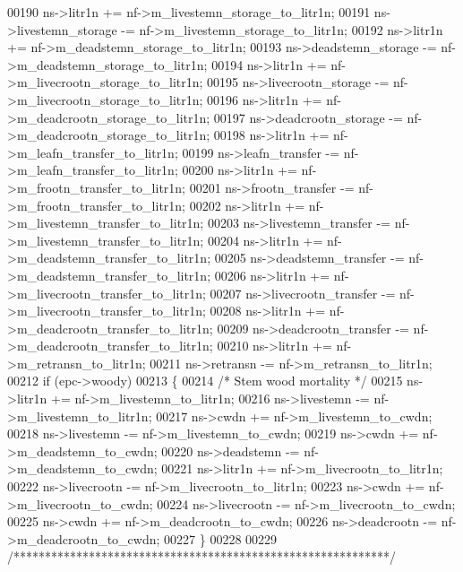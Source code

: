 \begin{DoxyCode}
00190     ns->litr1n              += nf->m\_livestemn\_storage\_to\_litr1n;
00191     ns->livestemn\_storage   -= nf->m\_livestemn\_storage\_to\_litr1n;
00192     ns->litr1n              += nf->m\_deadstemn\_storage\_to\_litr1n;
00193     ns->deadstemn\_storage   -= nf->m\_deadstemn\_storage\_to\_litr1n;
00194     ns->litr1n              += nf->m\_livecrootn\_storage\_to\_litr1n;
00195     ns->livecrootn\_storage  -= nf->m\_livecrootn\_storage\_to\_litr1n;
00196     ns->litr1n              += nf->m\_deadcrootn\_storage\_to\_litr1n;
00197     ns->deadcrootn\_storage  -= nf->m\_deadcrootn\_storage\_to\_litr1n;
00198     ns->litr1n              += nf->m\_leafn\_transfer\_to\_litr1n;
00199     ns->leafn\_transfer      -= nf->m\_leafn\_transfer\_to\_litr1n;
00200     ns->litr1n              += nf->m\_frootn\_transfer\_to\_litr1n;
00201     ns->frootn\_transfer     -= nf->m\_frootn\_transfer\_to\_litr1n;
00202     ns->litr1n              += nf->m\_livestemn\_transfer\_to\_litr1n;
00203     ns->livestemn\_transfer  -= nf->m\_livestemn\_transfer\_to\_litr1n;
00204     ns->litr1n              += nf->m\_deadstemn\_transfer\_to\_litr1n;
00205     ns->deadstemn\_transfer  -= nf->m\_deadstemn\_transfer\_to\_litr1n;
00206     ns->litr1n              += nf->m\_livecrootn\_transfer\_to\_litr1n;
00207     ns->livecrootn\_transfer -= nf->m\_livecrootn\_transfer\_to\_litr1n;
00208     ns->litr1n              += nf->m\_deadcrootn\_transfer\_to\_litr1n;
00209     ns->deadcrootn\_transfer -= nf->m\_deadcrootn\_transfer\_to\_litr1n;
00210     ns->litr1n              += nf->m\_retransn\_to\_litr1n;
00211     ns->retransn            -= nf->m\_retransn\_to\_litr1n;
00212     \textcolor{keywordflow}{if} (epc->woody)
00213     \{
00214         \textcolor{comment}{/*    Stem wood mortality */}
00215         ns->litr1n     += nf->m\_livestemn\_to\_litr1n;
00216         ns->livestemn  -= nf->m\_livestemn\_to\_litr1n;
00217         ns->cwdn       += nf->m\_livestemn\_to\_cwdn;
00218         ns->livestemn  -= nf->m\_livestemn\_to\_cwdn;
00219         ns->cwdn       += nf->m\_deadstemn\_to\_cwdn;
00220         ns->deadstemn  -= nf->m\_deadstemn\_to\_cwdn;
00221         ns->litr1n     += nf->m\_livecrootn\_to\_litr1n;
00222         ns->livecrootn -= nf->m\_livecrootn\_to\_litr1n;
00223         ns->cwdn       += nf->m\_livecrootn\_to\_cwdn;
00224         ns->livecrootn -= nf->m\_livecrootn\_to\_cwdn;
00225         ns->cwdn       += nf->m\_deadcrootn\_to\_cwdn;
00226         ns->deadcrootn -= nf->m\_deadcrootn\_to\_cwdn;
00227     \}
00228     
00229     \textcolor{comment}{/************************************************************/}

\end{DoxyCode}
